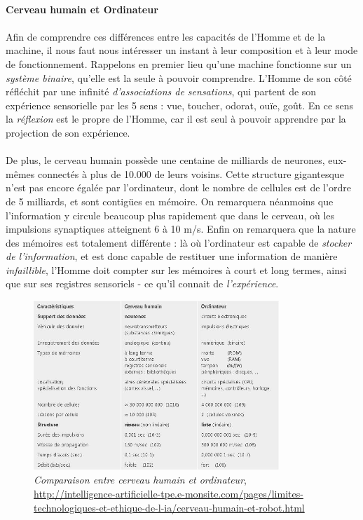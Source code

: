\paragraph{Cerveau humain et Ordinateur}

\paragraph{} Afin de comprendre ces différences entre les capacités de l'Homme et de la machine, il nous faut nous
intéresser un instant à leur composition et à leur mode de fonctionnement. Rappelons en premier lieu qu'une machine
fonctionne sur un \emph{système binaire}, qu'elle est la seule à pouvoir comprendre. L'Homme de son côté réfléchit
par une infinité \emph{d'associations de sensations}, qui partent de son expérience sensorielle par les 5 sens : vue,
toucher, odorat, ouïe, goût. En ce sens la \emph{réflexion} est le propre de l'Homme, car il est seul à pouvoir 
apprendre par la projection de son expérience. \cite{Internet5}

\paragraph{} De plus, le cerveau humain possède une centaine de milliards de neurones, eux-mêmes connectés à plus de 10.000
de leurs voisins. Cette structure gigantesque n'est pas encore égalée par l'ordinateur, dont le nombre de cellules est de
l'ordre de 5 milliards, et sont contigües en mémoire. On remarquera néanmoins que l'information y circule
beaucoup plus rapidement que dans le cerveau, où les impulsions synaptiques atteignent 6 à 10 m/s. Enfin on remarquera que la
nature des mémoires est totalement différente : là où l'ordinateur est capable de \emph{stocker de l'information}, et est donc
capable de restituer une information de manière \emph{infaillible}, l'Homme doit compter sur les mémoires à court et long termes,
ainsi que sur ses registres sensoriels - ce qu'il connait de \emph{l'expérience}. \cite{Internet4}

\begin{figure}[h]
    \centering
    \includegraphics[width=350px]{chapters/03/images/cerveau-robot.jpg}
    \caption{\label{comparatif} \emph{Comparaison entre cerveau humain et ordinateur}, \url{http://intelligence-artificielle-tpe.e-monsite.com/pages/limites-technologiques-et-ethique-de-l-ia/cerveau-humain-et-robot.html}}
\end{figure}

